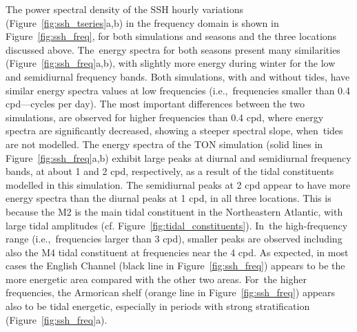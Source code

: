 \documentclass[jmse,article,accept,moreauthors,pdftex]{Definitions/mdpi}
\begin{document}
The power spectral density of the SSH hourly variations (Figure~\ref{fig:ssh_tseries}a,b) in the frequency domain is shown in Figure~\ref{fig:ssh_freq}, for both simulations and seasons and the three locations discussed above. The~energy spectra for both seasons present many similarities (Figure~\ref{fig:ssh_freq}a,b), with slightly more energy during winter for the low and semidiurnal frequency bands. Both simulations, with and without tides, have similar energy spectra values at low frequencies (i.e.,~frequencies smaller than 0.4 cpd---cycles per day). The most important differences between the two simulations, are observed for higher frequencies than 0.4 cpd, where energy spectra are significantly decreased, showing a steeper spectral slope, when~tides are not modelled. The energy spectra of the TON simulation (solid lines in Figure~\ref{fig:ssh_freq}a,b) exhibit large peaks at diurnal and semidiurnal frequency bands, at about 1 and 2 cpd, respectively, as a result of the tidal constituents modelled in this simulation. The semidiurnal peaks at 2 cpd appear to have more energy spectra than the diurnal peaks at 1 cpd, in all three locations. This is because the M2 is the main tidal constituent in the Northeastern Atlantic, with large tidal amplitudes (cf. Figure~\ref{fig:tidal_constituents}). In~the high-frequency range (i.e.,~frequencies larger than 3 cpd), smaller peaks are observed including also the M4 tidal constituent at frequencies near the 4 cpd. As expected, in most cases the English Channel (black line in Figure~\ref{fig:ssh_freq}) appears to be the more energetic area compared with the other two areas. For~the higher frequencies, the Armorican shelf (orange line in Figure~\ref{fig:ssh_freq}) appears also to be tidal energetic, especially in periods with strong stratification (Figure~\ref{fig:ssh_freq}a).
\end{document}
